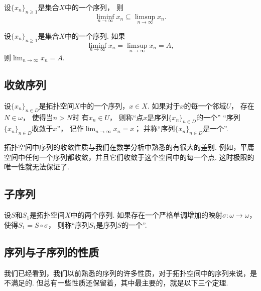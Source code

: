\begin{proposition}
设\(\{x_n\}_{n\geq1}\)是集合\(X\)中的一个序列，
则\begin{equation}
	\liminf_{n\to\infty} x_n
	\subseteq
	\limsup_{n\to\infty} x_n.
\end{equation}
\end{proposition}

\begin{theorem}
设\(\{x_n\}_{n\geq1}\)是集合\(X\)中的一个序列.
如果\[
	\liminf_{n\to\infty} x_n
	= \limsup_{n\to\infty} x_n
	= A,
\]
则\(\lim_{n\to\infty} x_n = A\).
\end{theorem}

\subsection{收敛序列}
\begin{definition}\label{definition:序列.序列的聚点}
设\(\{x_n\}_{n \in D}\)是拓扑空间\(X\)中的一个序列，\(x \in X\).
如果对于\(x\)的每一个邻域\(U\)，
存在\(N \in \omega\)，
使得当\(n > N\)时
有\(x_n \in U\)，
则称“点\(x\)是序列\(\{x_n\}_{n \in D}\)的一个”
“序列\(\{x_n\}_{n \in D}\)收敛于\(x\)”，
记作\(\lim_{n\to\infty} x_n = x\)；
并称“序列\(\{x_n\}_{n \in D}\)是一个”.
\end{definition}

拓扑空间中序列的收敛性质与我们在数学分析中熟悉的有很大的差别.
例如，平庸空间中任何一个序列都收敛，并且它们收敛于这个空间中的每一个点.
这时极限的唯一性就无法保证了.

\subsection{子序列}
\begin{definition}\label{definition:序列.子序列}
设\(S\)和\(S_1\)是拓扑空间\(X\)中的两个序列.
如果存在一个严格单调增加的映射\(\sigma\colon \omega \to \omega\)，
使得\(S_1 = S \circ \sigma\)，
则称“序列\(S_1\)是序列\(S\)的一个”.
\end{definition}

\subsection{序列与子序列的性质}
我们已经看到，我们以前熟悉的序列的许多性质，对于拓扑空间中的序列来说，是不满足的.
但总有一些性质还保留着，其中最主要的，就是以下三个定理.

